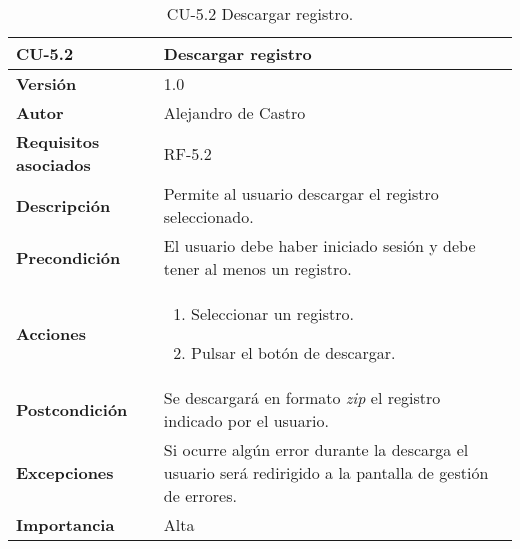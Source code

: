 \begin{table}[p]
	\centering
	\begin{tabularx}{\linewidth}{ p{} p{} }
		\toprule
		\textbf{CU-5.2}    & \textbf{Descargar registro}\\
		\toprule
		\textbf{Versión}              & 1.0    \\
		\textbf{Autor}                & {Alejandro de Castro} \\
		\textbf{Requisitos asociados} & RF-5.2 \\
		\textbf{Descripción}          & Permite al usuario descargar el registro seleccionado. \\
		\textbf{Precondición}         & El usuario debe haber iniciado sesión y debe tener al menos un registro. \\
        \textbf{Acciones}             &
		\begin{enumerate}
			\def\labelenumi{\arabic{enumi}.}
			\tightlist
			\item Seleccionar un registro.
			\item Pulsar el botón de descargar.
		\end{enumerate}\\ 
		\textbf{Postcondición}        & Se descargará en formato \textit{zip} el registro indicado por el usuario. \\
		\textbf{Excepciones}          & Si ocurre algún error durante la descarga el usuario será redirigido a la pantalla de gestión de errores. \\
		\textbf{Importancia}          & Alta \\
		\bottomrule
	\end{tabularx}
	\caption{CU-5.2 Descargar registro.}
\end{table}

